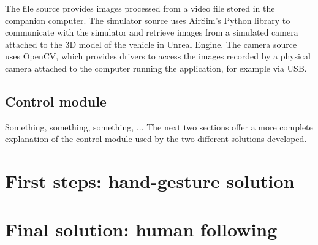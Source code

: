 The file source provides images processed from a video file stored in the companion computer.
The simulator source uses AirSim's Python library to communicate with the simulator and retrieve images from a simulated camera attached to the 3D model of the vehicle in Unreal Engine.
The camera source uses OpenCV, which provides drivers to access the images recorded by a physical camera attached to the computer running the application, for example via USB.

\subsection{Control module}
Something, something, something, ... The next two sections offer a more complete explanation of the control module used by the two different solutions developed.


\section{First steps: hand-gesture solution}

\section{Final solution: human following}



\cleardoublepage